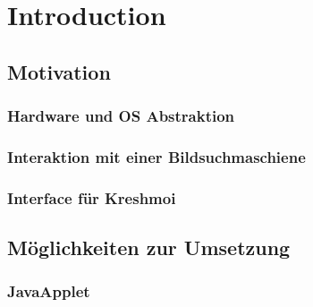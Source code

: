\section{Introduction}
\label{sec:introduction}

\subsection{Motivation}
\label{sec:Motivation}

\subsubsection{Hardware und OS Abstraktion}
\label{sec:Hardware und OS Abstraktion}

\subsubsection{Interaktion mit einer Bildsuchmaschiene}
\label{sec:Interaktion mit einer Bildsuchmaschiene}

\subsubsection{Interface für Kreshmoi}
\label{sec:Interface für Kreshmoi}

\subsection{Möglichkeiten zur Umsetzung}
\label{sec:Möglichkeiten zur Umsetzung}

\subsubsection{JavaApplet}
\label{sec:JavaApplet}

